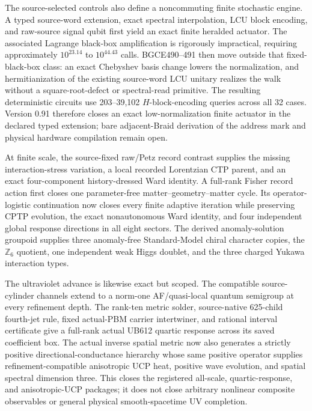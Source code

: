 \documentclass[11pt]{article}
\theoremstyle{definition}
\theoremstyle{remark}
\begin{document}
The source-selected controls also define a noncommuting finite stochastic engine. A typed source-word extension, exact spectral interpolation, LCU block encoding, and raw-source signal qubit first yield an exact finite heralded actuator. The associated Lagrange black-box amplification is rigorously impractical, requiring approximately $10^{23.14}$ to $10^{44.43}$ calls. BGCE490--491 then move outside that fixed-black-box class: an exact Chebyshev basis change lowers the normalization, and hermitianization of the existing source-word LCU unitary realizes the walk without a square-root-defect or spectral-read primitive. The resulting deterministic circuits use 203--39,102 $H$-block-encoding queries across all 32 cases. Version 0.91 therefore closes an exact low-normalization finite actuator in the declared typed extension; bare adjacent-Braid derivation of the address mark and physical hardware compilation remain open.

At finite scale, the source-fixed raw/Petz record contrast supplies the missing interaction-stress variation, a local recorded Lorentzian CTP parent, and an exact four-component history-dressed Ward identity. A full-rank Fisher record action first closes one parameter-free matter--geometry--matter cycle. Its operator-logistic continuation now closes every finite adaptive iteration while preserving CPTP evolution, the exact nonautonomous Ward identity, and four independent global response directions in all eight sectors. The derived anomaly-solution groupoid supplies three anomaly-free Standard-Model chiral character copies, the $\mathbb Z_6$ quotient, one independent weak Higgs doublet, and the three charged Yukawa interaction types.

The ultraviolet advance is likewise exact but scoped. The compatible source-cylinder channels extend to a norm-one AF/quasi-local quantum semigroup at every refinement depth. The rank-ten metric solder, source-native 625-child fourth-jet rule, fixed actual-PBM carrier intertwiner, and rational interval certificate give a full-rank actual UB612 quartic response across its saved coefficient box. The actual inverse spatial metric now also generates a strictly positive directional-conductance hierarchy whose same positive operator supplies refinement-compatible anisotropic UCP heat, positive wave evolution, and spatial spectral dimension three. This closes the registered all-scale, quartic-response, and anisotropic-UCP packages; it does not close arbitrary nonlinear composite observables or general physical smooth-spacetime UV completion.
\end{document}
